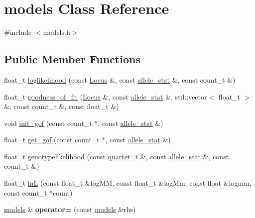 \hypertarget{classmodels}{\section{models Class Reference}
\label{classmodels}
}


{\ttfamily \#include $<$models.\-h$>$}

\subsection*{Public Member Functions}
\begin{DoxyCompactItemize}
\item 
float\-\_\-t \hyperlink{classmodels_a57d9f7de3f3d021007e8700cf4a07814}{loglikelihood} (const \hyperlink{classLocus}{Locus} \&, const \hyperlink{classallele__stat}{allele\-\_\-stat} \&, const count\-\_\-t \&)
\item 
float\-\_\-t \hyperlink{classmodels_a526bfb6a483fc01763a71dcf18f009c3}{goodness\-\_\-of\-\_\-fit} (\hyperlink{classLocus}{Locus} \&, const \hyperlink{classallele__stat}{allele\-\_\-stat} \&, std\-::vector$<$ float\-\_\-t $>$ \&, const count\-\_\-t \&, const float\-\_\-t \&)
\item 
void \hyperlink{classmodels_af1a44983f9f2a3473e0905182031fa03}{init\-\_\-gof} (const count\-\_\-t $\ast$, const \hyperlink{classallele__stat}{allele\-\_\-stat} \&)
\item 
float\-\_\-t \hyperlink{classmodels_a58b7ede52bb34e64c0ea80cdcc81be1e}{get\-\_\-gof} (const count\-\_\-t $\ast$, const \hyperlink{classallele__stat}{allele\-\_\-stat} \&)
\item 
float\-\_\-t \hyperlink{classmodels_a67c5d64baed8963d4306646e5e5be38d}{genotypelikelihood} (const \hyperlink{structquartet}{quartet\-\_\-t} \&, const \hyperlink{classallele__stat}{allele\-\_\-stat} \&, const count\-\_\-t \&)
\item 
float\-\_\-t \hyperlink{classmodels_a4c3e1316da574d7eab691e8dfd32c486}{ln\-L} (const float\-\_\-t \&log\-M\-M, const float\-\_\-t \&log\-Mm, const float \&logmm, const count\-\_\-t $\ast$count)
\item 
\hypertarget{classmodels_a33b232eed7d936124a470a2c87ffdc39}{\hyperlink{classmodels}{models} \& {\bfseries operator=} (const \hyperlink{classmodels}{models} \&rhs)}\label{classmodels_a33b232eed7d936124a470a2c87ffdc39}

\end{DoxyCompactItemize}
